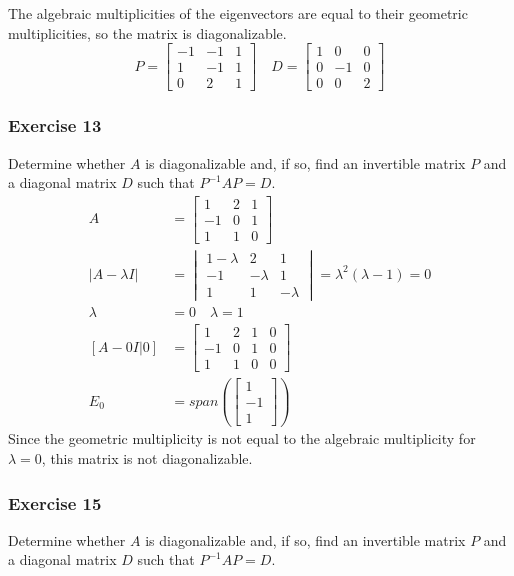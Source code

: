 \documentclass{math}
\begin{document}
The algebraic multiplicities of the eigenvectors are equal to their geometric
multiplicities, so the matrix is diagonalizable.
\[ P = \begin{bmatrix}
    -1 & -1 & 1 \\
    1 & -1 & 1 \\
    0 & 2 & 1
  \end{bmatrix} \quad D = \begin{bmatrix}
    1 & 0 & 0 \\
    0 & -1 & 0 \\
    0 & 0 & 2
  \end{bmatrix} \]

\subsubsection*{Exercise 13}
Determine whether \( A \) is diagonalizable and, if so, find an invertible
matrix \( P \) and a diagonal matrix \( D \) such that \( P^{-1}AP = D \).
\begin{align*}
  A &= \begin{bmatrix}
    1 & 2 & 1 \\
    -1 & 0 & 1 \\
    1 & 1 & 0
  \end{bmatrix} \\
  |A-\lambda I| &= \begin{vmatrix}
    1-\lambda & 2 & 1 \\
    -1 & -\lambda & 1 \\
    1 & 1 & -\lambda
  \end{vmatrix} = \lambda^2(\lambda-1) = 0 \\
  \lambda &= 0 \quad \lambda = 1 \\
  [A-0I|0] &= \begin{bmatrix}
    1 & 2 & 1 & 0 \\
    -1 & 0 & 1 & 0\\
    1 & 1 & 0 & 0
  \end{bmatrix} \\
  E_0 &= span\left(\begin{bmatrix}1 \\ -1 \\ 1\end{bmatrix}\right)
\end{align*}
Since the geometric multiplicity is not equal to the algebraic multiplicity for
\( \lambda = 0 \), this matrix is not diagonalizable.

\subsubsection*{Exercise 15}
Determine whether \( A \) is diagonalizable and, if so, find an invertible
matrix \( P \) and a diagonal matrix \( D \) such that \( P^{-1}AP = D \).
\end{document}
